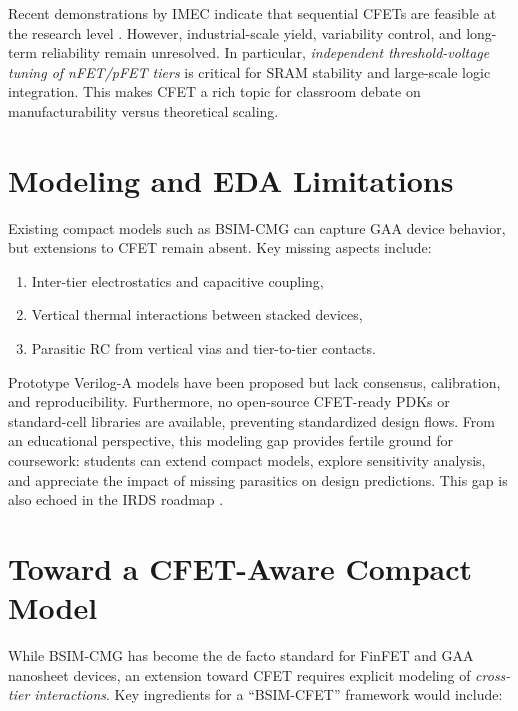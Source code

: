 \documentclass[conference]{IEEEtran}
\begin{document}
Recent demonstrations by IMEC indicate that sequential CFETs are feasible at the research level \cite{imec_cfet_iedm2020}.
However, industrial-scale yield, variability control, and long-term reliability remain unresolved.
In particular, \emph{independent threshold-voltage tuning of nFET/pFET tiers} is critical for SRAM stability and large-scale logic integration.
This makes CFET a rich topic for classroom debate on manufacturability versus theoretical scaling.

\section{Modeling and EDA Limitations}
Existing compact models such as BSIM-CMG can capture GAA device behavior, but extensions to CFET remain absent.
Key missing aspects include:
\begin{enumerate}
  \item Inter-tier electrostatics and capacitive coupling,
  \item Vertical thermal interactions between stacked devices,
  \item Parasitic RC from vertical vias and tier-to-tier contacts.
\end{enumerate}
Prototype Verilog-A models have been proposed but lack consensus, calibration, and reproducibility.
Furthermore, no open-source CFET-ready PDKs or standard-cell libraries are available, preventing standardized design flows.
From an educational perspective, this modeling gap provides fertile ground for coursework:
students can extend compact models, explore sensitivity analysis, and appreciate the impact of missing parasitics on design predictions.
This gap is also echoed in the IRDS roadmap \cite{irds_2023}.

\section{Toward a CFET-Aware Compact Model}
While BSIM-CMG has become the de facto standard for FinFET and GAA nanosheet devices,
an extension toward CFET requires explicit modeling of \emph{cross-tier interactions}.
Key ingredients for a ``BSIM-CFET'' framework would include:
\end{document}
